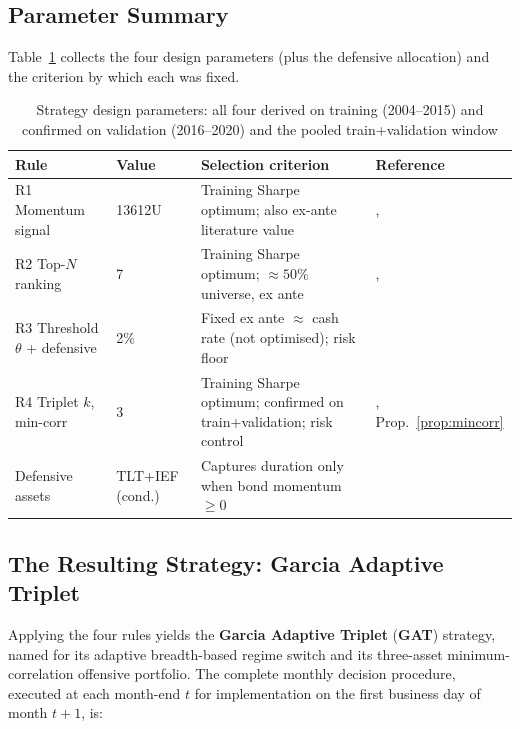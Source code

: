 \subsection{Parameter Summary}
\label{sec:params}

Table~\ref{tab:params} collects the four design parameters (plus the defensive
allocation) and the criterion by which each was fixed.

\begin{table}[H]
\centering
\caption{Strategy design parameters: all four derived on training (2004--2015) and confirmed on validation (2016--2020) and the pooled train+validation window}
\label{tab:params}
\small
\begin{tabular}{lllp{4.4cm}}
\toprule
Rule & Value & Selection criterion & Reference \\
\midrule
R1 Momentum signal & 13612U & Training Sharpe optimum; also ex-ante literature value & \citet{moskowitz2012}, \citet{keller2017} \\
R2 Top-$N$ ranking & 7 & Training Sharpe optimum; $\approx 50\%$ universe, ex ante & \citet{faber2007}, \citet{keller2017} \\
R3 Threshold $\theta$ + defensive & 2\% & Fixed ex ante $\approx$ cash rate (not optimised); risk floor & \citet{antonacci2014} \\
R4 Triplet $k$, min-corr & 3 & Training Sharpe optimum; confirmed on train+validation; risk control & \citet{markowitz1952}, Prop.~\ref{prop:mincorr} \\
\midrule
Defensive assets & TLT+IEF (cond.) & Captures duration only when bond momentum $\geq 0$ & \citet{barroso2015} \\
\bottomrule
\end{tabular}
\end{table}

\subsection{The Resulting Strategy: Garcia Adaptive Triplet}
\label{sec:s36}

Applying the four rules yields the \textbf{Garcia Adaptive Triplet} (\textbf{GAT}) strategy, named for its adaptive breadth-based regime switch and its three-asset minimum-correlation offensive portfolio. The complete monthly decision
procedure, executed at each month-end $t$ for implementation on the first business
day of month $t+1$, is:

